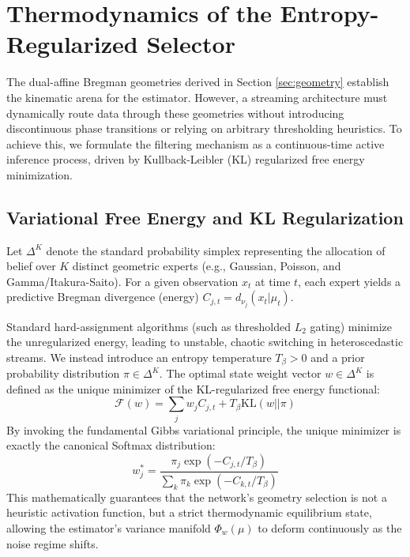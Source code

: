 \section{Thermodynamics of the Entropy-Regularized Selector}
\label{sec:thermodynamics}

The dual-affine Bregman geometries derived in Section \ref{sec:geometry} establish the kinematic arena for the estimator. However, a streaming architecture must dynamically route data through these geometries without introducing discontinuous phase transitions or relying on arbitrary thresholding heuristics. To achieve this, we formulate the filtering mechanism as a continuous-time active inference process, driven by Kullback-Leibler (KL) regularized free energy minimization.

\subsection{Variational Free Energy and KL Regularization}
Let $\Delta^K$ denote the standard probability simplex representing the allocation of belief over $K$ distinct geometric experts (e.g., Gaussian, Poisson, and Gamma/Itakura-Saito). For a given observation $x_t$ at time $t$, each expert yields a predictive Bregman divergence (energy) $C_{j,t} = d_{\nu_j}(x_t | \mu_t)$. 

Standard hard-assignment algorithms (such as thresholded $L_2$ gating) minimize the unregularized energy, leading to unstable, chaotic switching in heteroscedastic streams. We instead introduce an entropy temperature $T_\beta > 0$ and a prior probability distribution $\pi \in \Delta^K$. The optimal state weight vector $w \in \Delta^K$ is defined as the unique minimizer of the KL-regularized free energy functional:
\begin{equation}
    \mathcal{F}(w) = \sum_{j} w_j C_{j,t} + T_\beta \mathrm{KL}(w || \pi)
\end{equation}
By invoking the fundamental Gibbs variational principle, the unique minimizer is exactly the canonical Softmax distribution:
\begin{equation}
    w_j^* = \frac{\pi_j \exp(-C_{j,t}/T_\beta)}{\sum_k \pi_k \exp(-C_{k,t}/T_\beta)}
\end{equation}
This mathematically guarantees that the network's geometry selection is not a heuristic activation function, but a strict thermodynamic equilibrium state, allowing the estimator's variance manifold $\Phi_w(\mu)$ to deform continuously as the noise regime shifts.

